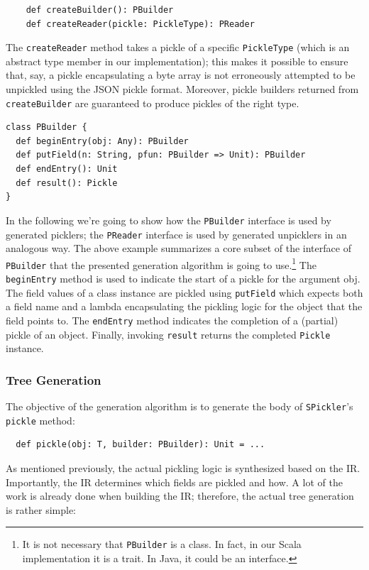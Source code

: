 \documentclass[preprint,10pt]{sigplanconf}
\theoremstyle{definition}
\theoremstyle{definition}
\newcommand{\term}[1]{\mbox{\texttt{#1}}}
\begin{document}
\begin{lstlisting}
    def createBuilder(): PBuilder
    def createReader(pickle: PickleType): PReader
\end{lstlisting}

The \term{createReader} method takes a pickle of a specific \term{PickleType}
(which is an abstract type member in our implementation); this makes it
possible to ensure that, say, a pickle encapsulating a byte array is not
erroneously attempted to be unpickled using the JSON pickle format. Moreover,
pickle builders returned from \verb|createBuilder| are guaranteed to produce
pickles of the right type.

\begin{lstlisting}
class PBuilder {
  def beginEntry(obj: Any): PBuilder
  def putField(n: String, pfun: PBuilder => Unit): PBuilder
  def endEntry(): Unit
  def result(): Pickle
}
\end{lstlisting}

In the following we're going to show how the \verb|PBuilder| interface is used
by generated picklers; the \verb|PReader| interface is used by generated
unpicklers in an analogous way. The above example summarizes a core
subset of the interface of \verb|PBuilder| that the presented generation
algorithm is going to use.\footnote{It is not necessary that \texttt{PBuilder}
is a class. In fact, in our Scala implementation it is a trait. In Java, it
could be an interface.} The \verb|beginEntry| method is used to indicate the
start of a pickle for the argument obj. The field values of a class instance
are pickled using \verb|putField| which expects both a field name and a lambda
encapsulating the pickling logic for the object that the field points to. The
\verb|endEntry| method indicates the completion of a (partial) pickle of an
object. Finally, invoking \verb|result| returns the completed \verb|Pickle|
instance.

\subsubsection{Tree Generation}

The objective of the generation algorithm is to generate the body of
\term{SPickler}'s \term{pickle} method:

\begin{lstlisting}
  def pickle(obj: T, builder: PBuilder): Unit = ...
\end{lstlisting}

As mentioned previously, the actual pickling logic is synthesized based on the
IR. Importantly, the IR determines which fields are pickled and how. A lot of
the work is already done when building the IR; therefore, the actual tree
generation is rather simple:
\end{document}
